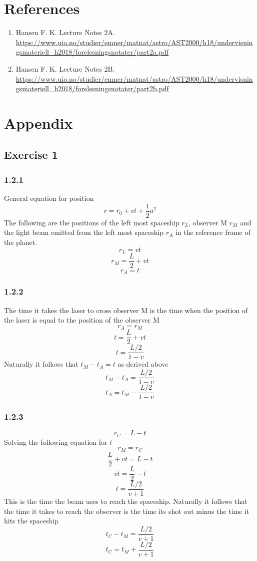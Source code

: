 \documentclass[reprint,english,notitlepage]{revtex4-2}
\begin{document}
\newpage
\section*{References} \label{sec: references}
\begin{enumerate}
  \item Hansen F. K. Lecture Notes 2A.  \url{https://www.uio.no/studier/emner/matnat/astro/AST2000/h18/undervisningsmateriell_h2018/forelesningsnotater/part2a.pdf}
  \item Hansen F. K. Lecture Notes 2B. \url{https://www.uio.no/studier/emner/matnat/astro/AST2000/h18/undervisningsmateriell_h2018/forelesningsnotater/part2b.pdf} \label{ref: Example worldline}
\end{enumerate}


\newpage
\section{Appendix} \label{sec: appendix}
\subsection{Exercise 1}
\subsubsection*{1.2.1}\label{1.2.1}
General equation for position
\[
r = r_0 + vt + \frac{1}{2} a^{2}
\]
The following are the positions of the left most spaceship $ r_L $, observer M $ r_M $ and the light beam emitted from the left most spaceship $ r_A $ in the reference frame of the planet.
\[
r_L = vt
\]
\[
r_M = \frac{L}{2} + vt
\]
\[
r_A = t
\]
\subsubsection*{1.2.2}\label{1.2.2}
The time it takes the laser to cross observer M is the time when the position of the laser is equal to the position of the observer M
\[
r_A = r_M
\]
\[
t = \frac{L}{2} + vt
\]
\[
t = \frac{L / 2}{1 - v}
\]  
Naturally it follows that $ t_M - t_A = t $ as derived above
\[
t_M - t_A = \frac{L / 2}{1 - v}
\]
\[
t_A = t_M - \frac{L / 2}{1 - v}
\]


\subsubsection*{1.2.3}\label{1.2.3}
\[
r_C = L - t
\]
Solving the following equation for $ t $
\[
r_M = r_C
\]
\[
\frac{L}{2} + vt = L - t
\]
\[
vt = \frac{L}{2} - t
\]
\[
t = \frac{L / 2}{v + 1}
\]
This is the time the beam uses to reach the spaceship. Naturally it follows that the time it takes to reach the observer is the time its shot out minus the time it hits the spaceship
\[
t_C - t_M = \frac{L / 2}{v + 1}
\]  
\[
t_C = t_M + \frac{L / 2}{v + 1}
\]
\end{document}
